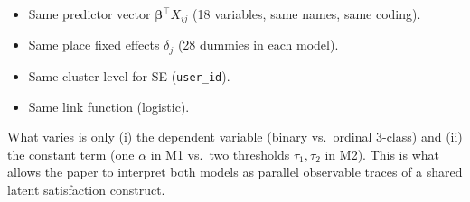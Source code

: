 \documentclass[11pt,a4paper]{article}
\begin{document}
\begin{itemize}
\itemsep0pt
\item Same predictor vector $\bm{\beta}^{\top} X_{ij}$ (18 variables, same names,
      same coding).
\item Same place fixed effects $\delta_j$ (28 dummies in each model).
\item Same cluster level for SE (\texttt{user\_id}).
\item Same link function (logistic).
\end{itemize}

What varies is only (i) the dependent variable (binary vs.\ ordinal 3-class)
and (ii) the constant term (one $\alpha$ in M1 vs.\ two thresholds
$\tau_1, \tau_2$ in M2). This is what allows the paper to interpret both
models as parallel observable traces of a shared latent satisfaction
construct.
\end{document}
